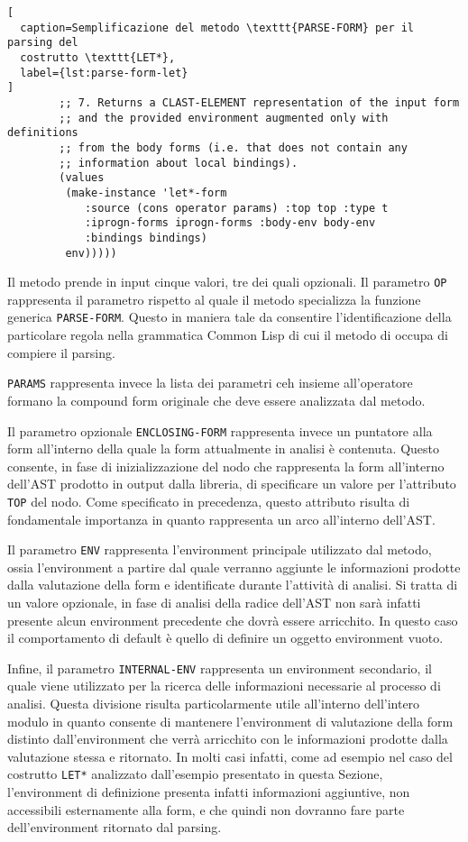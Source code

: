 \begin{lstlisting}[
  caption=Semplificazione del metodo \texttt{PARSE-FORM} per il parsing del
  costrutto \texttt{LET*},
  label={lst:parse-form-let}
]
        ;; 7. Returns a CLAST-ELEMENT representation of the input form
        ;; and the provided environment augmented only with definitions
        ;; from the body forms (i.e. that does not contain any
        ;; information about local bindings).
        (values
         (make-instance 'let*-form
            :source (cons operator params) :top top :type t
            :iprogn-forms iprogn-forms :body-env body-env
            :bindings bindings)
         env)))))

\end{lstlisting}

Il metodo prende in input cinque valori, tre dei quali opzionali. Il parametro
\texttt{OP} rappresenta il parametro rispetto al quale il metodo specializza
la funzione generica \texttt{PARSE-FORM}. Questo in maniera tale da consentire
l'identificazione della particolare regola nella grammatica Common Lisp di cui
il metodo di occupa di compiere il parsing.

\texttt{PARAMS} rappresenta invece la lista dei parametri ceh insieme
all'operatore formano la compound form originale che deve essere analizzata
dal metodo.

Il parametro opzionale \texttt{ENCLOSING-FORM} rappresenta invece un puntatore
alla form all'interno della quale la form attualmente in analisi è contenuta.
Questo consente, in fase di inizializzazione del nodo che rappresenta la form
all'interno dell'AST prodotto in output dalla libreria, di specificare un
valore per l'attributo \texttt{TOP} del nodo. Come specificato in precedenza,
questo attributo risulta di fondamentale importanza in quanto rappresenta un
arco all'interno dell'AST.

Il parametro \texttt{ENV} rappresenta l'environment principale utilizzato dal
metodo, ossia l'environment a partire dal quale verranno aggiunte le
informazioni prodotte dalla valutazione della form e identificate durante
l'attività di analisi. Si tratta di un valore opzionale, in fase di analisi
della radice dell'AST non sarà infatti presente alcun environment precedente
che dovrà essere arricchito. In questo caso il comportamento di default è
quello di definire un oggetto environment vuoto.

Infine, il parametro \texttt{INTERNAL-ENV} rappresenta un environment
secondario, il quale viene utilizzato per la ricerca delle informazioni
necessarie al processo di analisi. Questa divisione risulta particolarmente
utile all'interno dell'intero modulo in quanto consente di mantenere
l'environment di valutazione della form distinto dall'environment che verrà
arricchito con le informazioni prodotte dalla valutazione stessa e ritornato.
In molti casi infatti, come ad esempio nel caso del costrutto \texttt{LET*}
analizzato dall'esempio presentato in questa Sezione, l'environment di
definizione presenta infatti informazioni aggiuntive, non accessibili
esternamente alla form, e che quindi non dovranno fare parte dell'environment
ritornato dal parsing.

